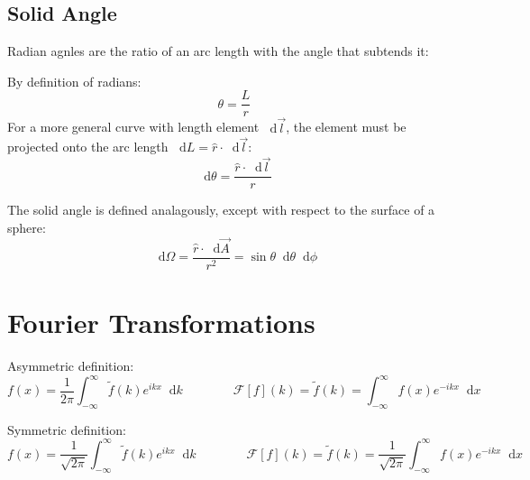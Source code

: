 \documentclass{article}
\newcommand{\diff}{\mathop{}\!\mathrm{d}}
\theoremstyle{definition}
\begin{document}
\subsection{Solid Angle}
Radian agnles are the ratio of an arc length with the angle that subtends it:
\begin{center}
\end{center}
By definition of radians:
\begin{equation*}
	\theta = \frac{L}{r}
\end{equation*}
For a more general curve with length element $\diff \vec{l}$, the element must be
projected onto the arc length $\diff L = \hat{r} \cdot \diff \vec{l}$:
\begin{equation*}
	\diff \theta = \frac{\hat{r} \cdot \diff \vec{l}}{r}
\end{equation*}

The solid angle is defined analagously, except with respect to the surface of a sphere:
\begin{equation*}
	\diff \Omega = \frac{\hat{r} \cdot \diff \vec{A}}{r^2} = \sin\theta \diff \theta \diff \phi
\end{equation*}


\section{Fourier Transformations}
Asymmetric definition:
\begin{equation*}
	f(x) = \frac{1}{2\pi} \int_{-\infty}^\infty \tilde{f}(k) e^{ikx} \diff k \qquad \qquad \mathcal{F}[f](k) = \tilde{f}(k) = \int_{-\infty}^\infty f(x) e^{-ikx} \diff x
\end{equation*}

Symmetric definition:
\begin{equation*}
	f(x) = \frac{1}{\sqrt{2\pi}} \int_{-\infty}^\infty \tilde{f}(k) e^{ikx} \diff k \qquad \qquad \mathcal{F}[f](k) = \tilde{f}(k) = \frac{1}{\sqrt{2\pi}} \int_{-\infty}^\infty f(x) e^{-ikx} \diff x
\end{equation*}
\end{document}

